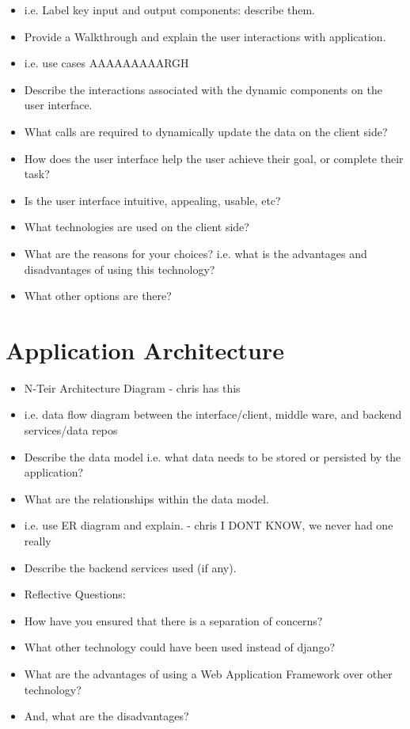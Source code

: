 \documentclass{sig-alt-release2}
\begin{document}
\begin{itemize}
\item	i.e. Label key input and output components: describe them.

\item	Provide a Walkthrough and explain the user interactions with application. 
\item	i.e. use cases AAAAAAAAARGH

\item	Describe the interactions associated with the dynamic components on the user interface.

\item	What calls are required to dynamically update the data on the client side?

\item	How does the user interface help the user achieve their goal, or complete their task? 

\item	Is the user interface intuitive, appealing, usable, etc?

\item	What technologies are used on the client side? 

\item	What are the reasons for your choices? i.e. what is the advantages and disadvantages of using this technology? 

\item	What other options are there? 

\end{itemize}

\section{Application Architecture}
\begin{itemize}

\item	N-Teir Architecture Diagram - chris has this

\item	i.e. data flow diagram between the interface/client, middle ware, and backend services/data repos

\item	Describe the data model i.e. what data needs to be stored or persisted by the application?

\item	What are the relationships within the data model.
\item	i.e. use ER diagram and explain. - chris I DONT KNOW, we never had one really

\item	Describe the backend services used (if any).

\item	Reflective Questions: 
\item	How have you ensured that there is a separation of concerns? 
\item	What other technology could have been used instead of django? 
\item	What are the advantages of using a Web Application Framework over other technology? 
\item	And, what are the disadvantages?
\end{itemize}
\end{document}
